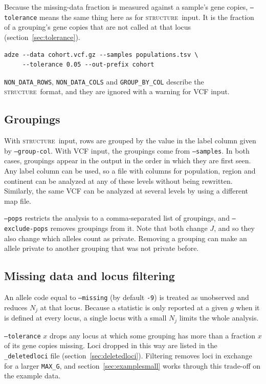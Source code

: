 \documentclass[11pt]{article}
\newcommand{\structureprog}{\textsc{structure}}
\newcommand{\flag}[1]{\texttt{#1}}
\begin{document}
Because the missing-data fraction is measured against a sample's gene copies,
\flag{--tolerance} means the same thing here as for \structureprog\ input. It
is the fraction of a grouping's gene copies that are not called at that locus
(section~\ref{sec:tolerance}).

\begin{Verbatim}[xleftmargin=1em]
adze --data cohort.vcf.gz --samples populations.tsv \
     --tolerance 0.05 --out-prefix cohort
\end{Verbatim}

\noindent \texttt{NON\_DATA\_ROWS}, \texttt{NON\_DATA\_COLS} and
\texttt{GROUP\_BY\_COL} describe the \structureprog\ format, and they are
ignored with a warning for VCF input.

\subsection{Groupings}

With \structureprog\ input, rows are grouped by the value in the label column
given by \flag{--group-col}. With VCF input, the groupings come from
\flag{--samples}. In both cases, groupings appear in the output in the order in
which they are first seen. Any label column can be used, so a file with columns
for population, region and continent can be analyzed at any of these levels
without being rewritten. Similarly, the same VCF can be analyzed at several
levels by using a different map file.

\flag{--pops} restricts the analysis to a comma-separated list of groupings,
and \flag{--exclude-pops} removes groupings from it. Note that both change $J$,
and so they also change which alleles count as private. Removing a grouping can
make an allele private to another grouping that was not private before.

\subsection{Missing data and locus filtering}
\label{sec:filter}
\label{sec:tolerance}

An allele code equal to \flag{--missing} (by default \texttt{-9}) is treated
as unobserved and reduces $N_j$ at that locus. Because a statistic is only
reported at a given $g$ when it is defined at every locus, a single locus with
a small $N_j$ limits the whole analysis.

\flag{--tolerance} $x$ drops any locus at which some grouping has more than a
fraction $x$ of its gene copies missing. Loci dropped in this way are listed in
the \texttt{\_deletedloci} file (section~\ref{sec:deletedloci}). Filtering
removes loci in exchange for a larger \texttt{MAX\_G}, and
section~\ref{sec:examplesmall} works through this trade-off on the example
data.
\end{document}
